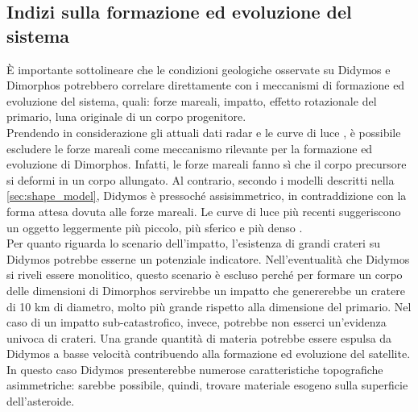 \subsection{Indizi sulla formazione ed evoluzione del sistema}
È importante sottolineare che le condizioni geologiche osservate su Didymos e Dimorphos potrebbero correlare direttamente con i meccanismi di formazione ed evoluzione del sistema, quali: forze mareali, impatto, effetto rotazionale del primario, luna originale di un corpo progenitore.\\
Prendendo in considerazione gli attuali dati radar \citep{naidu_radar_2020} e le curve di luce \citep{pravec_binary_2016}, è possibile escludere le forze mareali come meccanismo rilevante per la formazione ed evoluzione di Dimorphos. Infatti, le forze mareali fanno sì che il corpo precursore si deformi in un corpo allungato. Al contrario, secondo i modelli descritti nella \cref{sec:shape_model}, Didymos è pressoché assisimmetrico, in contraddizione con la forma attesa dovuta alle forze mareali. Le curve di luce più recenti suggeriscono un oggetto leggermente più piccolo, più sferico e più denso \citep{pravec_photometric_2022}.\\
Per quanto riguarda lo scenario dell'impatto, l'esistenza di grandi crateri su Didymos potrebbe esserne un potenziale indicatore. Nell'eventualità che Didymos si riveli essere monolitico, questo scenario è escluso perché per formare un corpo delle dimensioni di Dimorphos servirebbe un impatto che genererebbe un cratere di 10 km di diametro, molto più grande rispetto alla dimensione del primario. Nel caso di un impatto sub-catastrofico, invece, potrebbe non esserci un'evidenza univoca di crateri. Una grande quantità di materia potrebbe essere espulsa da Didymos a basse velocità contribuendo alla formazione ed evoluzione del satellite. In questo caso Didymos presenterebbe numerose caratteristiche topografiche asimmetriche: sarebbe possibile, quindi, trovare materiale esogeno sulla superficie dell'asteroide.


